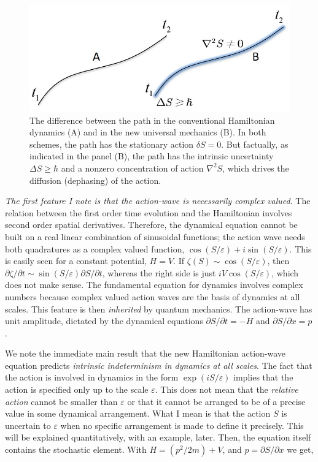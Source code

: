 \begin{figure}[H]
\centering
\includegraphics[scale=0.65]{src/images/chap27/2.jpg}
\caption{The difference between the path in the conventional Hamiltonian dynamics (A) and in
the new universal mechanics (B). In both schemes, the path has the stationary action $\delta S = 0$.
But factually, as indicated in the panel (B), the path has the intrinsic uncertainty $\Delta S \geq \hbar$ and a
nonzero concentration of action $\nabla^2 S$, which drives the diffusion (dephasing) of the action.}\label{ch14-fig2}
\end{figure}
\vskip 9pt

\textit{The first feature I note is that the action-wave is necessarily complex valued}. 
The relation between the first order time evolution and the Hamiltonian involves second order spatial
derivatives. Therefore, the dynamical equation cannot be built on a real linear combination of sinusoidal functions; the action wave needs
both quadratures as a complex valued function, $\cos(S/\varepsilon) + i \sin(S/\varepsilon)$. This is easily seen for
a constant potential, $H = V$. If $\zeta(S) \sim \cos (S/\varepsilon)$, 
then $\partial \zeta/\partial t \sim \sin (S/\varepsilon) \partial S/\partial t$, 
whereas the right side is just $iV \cos (S/\varepsilon)$, which does not make sense. The fundamental
equation for dynamics involves complex numbers because complex valued action waves are
the basis of dynamics at all scales. This feature is then \textit{inherited} by quantum mechanics.
The action-wave has unit amplitude, dictated by the dynamical equations $\partial S/\partial t = -H$ and
$\partial S/\partial x = p$.

We note the immediate main result that the new Hamiltonian action-wave equation
predicts \textit{intrinsic indeterminism in dynamics at all scales}. The fact that the action is
involved in dynamics in the form $\exp(iS/\varepsilon)$ implies that the action is specified only up to
the scale $\varepsilon$. This does not mean that the \textit{relative action} cannot be smaller than $\varepsilon$ or that it cannot be
arranged to be of a precise value in some dynamical arrangement. What I mean is that the
action $S$ is uncertain to $\varepsilon$ when no specific arrangement is made to define it precisely. This
will be explained quantitatively, with an example, later. Then, the equation itself contains
the stochastic element. With $H = (p^2 /2m) + V$, and $p = \partial S/\partial x$ we get,

